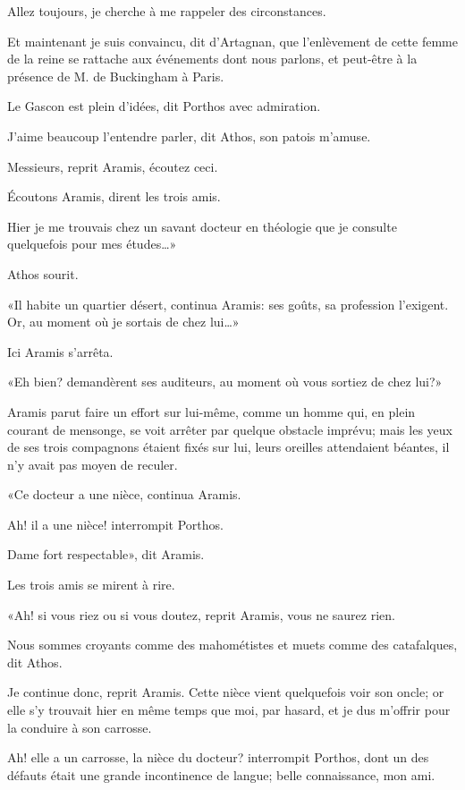 \speak  Allez toujours, je cherche à me rappeler des circonstances. 

\speak  Et maintenant je suis convaincu, dit d'Artagnan, que l'enlèvement de cette femme de la reine se rattache aux événements dont nous parlons, et peut-être à la présence de M. de Buckingham à Paris. 

\speak  Le Gascon est plein d'idées, dit Porthos avec admiration. 

\speak  J'aime beaucoup l'entendre parler, dit Athos, son patois m'amuse. 

\speak  Messieurs, reprit Aramis, écoutez ceci. 

\speak  Écoutons Aramis, dirent les trois amis. 

\speak  Hier je me trouvais chez un savant docteur en théologie que je consulte quelquefois pour mes études\dots» 

Athos sourit. 

«Il habite un quartier désert, continua Aramis: ses goûts, sa profession l'exigent. Or, au moment où je sortais de chez lui\dots» 

Ici Aramis s'arrêta. 

«Eh bien? demandèrent ses auditeurs, au moment où vous sortiez de chez lui?» 

Aramis parut faire un effort sur lui-même, comme un homme qui, en plein courant de mensonge, se voit arrêter par quelque obstacle imprévu; mais les yeux de ses trois compagnons étaient fixés sur lui, leurs oreilles attendaient béantes, il n'y avait pas moyen de reculer. 

«Ce docteur a une nièce, continua Aramis. 

\speak  Ah! il a une nièce! interrompit Porthos. 

\speak  Dame fort respectable», dit Aramis. 

Les trois amis se mirent à rire. 

«Ah! si vous riez ou si vous doutez, reprit Aramis, vous ne saurez rien. 

\speak  Nous sommes croyants comme des mahométistes et muets comme des catafalques, dit Athos. 

\speak  Je continue donc, reprit Aramis. Cette nièce vient quelquefois voir son oncle; or elle s'y trouvait hier en même temps que moi, par hasard, et je dus m'offrir pour la conduire à son carrosse. 

\speak  Ah! elle a un carrosse, la nièce du docteur? interrompit Porthos, dont un des défauts était une grande incontinence de langue; belle connaissance, mon ami. 

